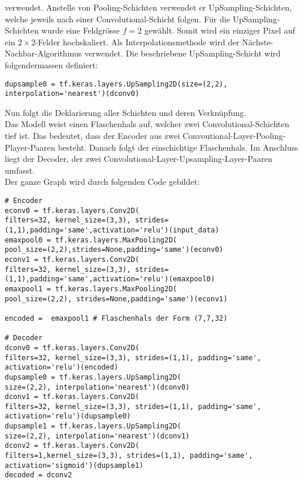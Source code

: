 verwendet. Anstelle von Pooling-Schichten verwendet er UpSampling-Schichten,
welche jeweils nach einer Convolutional-Schicht folgen.
Für die UpSampling-Schichten wurde eine Feldgrösse $f = 2$ gewählt. Somit wird
ein einziger Pixel auf ein $2 \times 2$-Felder hochskaliert.
Als Interpolationsmethode wird der Nächste-Nachbar-Algorithmus verwendet.
Die beschriebene UpSampling-Schicht wird folgendermassen definiert:
\begin{verbatim}
dupsample0 = tf.keras.layers.UpSampling2D(size=(2,2), interpolation='nearest')(dconv0)
\end{verbatim}
Nun folgt die Deklarierung aller Schichten und deren Verknüpfung. \\
Das Modell weist einen Flaschenhals auf, welcher zwei Convolutional-Schichten
tief ist. Das bedeutet, dass der Encoder aus zwei
Convoutional-Layer-Pooling-Player-Paaren besteht. Danach folgt der einschichtige
Flaschenhals. Im Anschluss liegt der Decoder, der zwei
Convolutional-Layer-Upsampling-Layer-Paaren umfasst. \\
Der ganze Graph wird durch folgenden Code gebildet:
\begin{verbatim}
# Encoder
econv0 = tf.keras.layers.Conv2D(
filters=32, kernel_size=(3,3), strides=(1,1),padding='same',activation='relu')(input_data)
emaxpool0 = tf.keras.layers.MaxPooling2D(
pool_size=(2,2),strides=None,padding='same')(econv0)
econv1 = tf.keras.layers.Conv2D(
filters=32, kernel_size=(3,3), strides=(1,1),padding='same',activation='relu')(emaxpool0)
emaxpool1 = tf.keras.layers.MaxPooling2D(
pool_size=(2,2), strides=None,padding='same')(econv1)

encoded =  emaxpool1 # Flaschenhals der Form (7,7,32)

# Decoder
dconv0 = tf.keras.layers.Conv2D(
filters=32, kernel_size=(3,3), strides=(1,1), padding='same', activation='relu')(encoded)
dupsample0 = tf.keras.layers.UpSampling2D(
size=(2,2), interpolation='nearest')(dconv0)
dconv1 = tf.keras.layers.Conv2D(
filters=32, kernel_size=(3,3), strides=(1,1), padding='same', activation='relu')(dupsample0)
dupsample1 = tf.keras.layers.UpSampling2D(
size=(2,2), interpolation='nearest')(dconv1)
dconv2 = tf.keras.layers.Conv2D(
filters=1,kernel_size=(3,3), strides=(1,1), padding='same', activation='sigmoid')(dupsample1)
decoded = dconv2
\end{verbatim}
